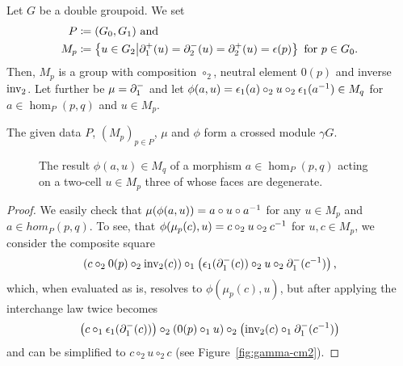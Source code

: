 \begin{lemma}
Let $G$ be a double groupoid. We set
\begin{align*}
P &\coloneqq (G_0,G_1) \text{ and } \\
M_p &\coloneqq \left\{ u \in G_2 \middle| \partial^+_1(u) = \partial^-_2(u) = \partial^+_2(u) = \epsilon(p) \right\}
	\text{ for $p \in G_0$.}
\end{align*}
Then, $M_p$ is a group with composition $\circ_2$, neutral element $0(p)$ and
inverse $\operatorname{inv_2}$.
Let further be $\mu = \partial^-_1$ and let $\phi(a,u) =
\epsilon_1(a) \circ_2 u \circ_2 \epsilon_1(a^{-1}) \in M_q$ for $a \in \hom_P(p,q)$
and $u \in M_p$.

The given data $P$, $(M_p)_{p \in P}$, $\mu$ and $\phi$ form a crossed module $\gamma G$.
\end{lemma}

\begin{figure} \centering
{}
\caption{The result $\phi(a,u) \in M_q$ of a morphism $a \in \hom_P(p,q)$ acting
on a two-cell $u \in M_p$ three of whose faces are degenerate.}
\label{fig:gamma-phi}
\end{figure}

\begin{proof}
We easily check that $\mu(\phi(a,u)) = a \circ u \circ a^{-1}$ for any $u \in M_p$
and $a \in hom_P(p,q)$.
To see, that $\phi(\mu_p(c),u) = c \circ_2 u \circ_2 c^{-1}$ for $u,c \in M_p$,
we consider the composite square
\begin{equation*}
\left(c \circ_2 0(p) \circ_2 \operatorname{inv_2}(c)\right) \circ_1
	\left(\epsilon_1(\partial^-_1(c)) \circ_2 u \circ_2 \partial^-_1(c^{-1})\right) \text{,}
\end{equation*}
which, when evaluated as is, resolves to $\phi(\mu_p(c),u)$, but after applying
the interchange law twice becomes
\begin{equation*}
\left(c \circ_1 \epsilon_1(\partial^-_1(c))\right)
	\circ_2 \left(0(p) \circ_1 u\right)
	\circ_2 \left(\operatorname{inv_2}(c) \circ_1 \partial^-_1(c^{-1})\right)
\end{equation*}
and can be simplified to $c \circ_2 u \circ_2 c$ (see Figure~\ref{fig:gamma-cm2}).
\end{proof}

